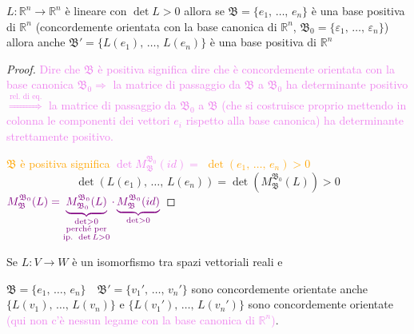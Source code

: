         \begin{proposizione}
        \label{prop:isometrie_dirette_preservano_orientazione}
        $L \colon \mathbb{R}^n \to \mathbb{R}^n$ è lineare con $\det L >0$ allora se $\mathfrak{B}= \{e_1, \, \dots, \, e_n\}$ è una 
        base positiva di $\mathbb{R}^n$ \textcolor{blu}{(concordemente orientata con la base canonica di $\mathbb{R}^n$, $\mathfrak{B}_0= \{\varepsilon_1, \, \dots, \, \varepsilon_n\}$)}
        allora anche $\mathfrak{B}'= \{L(e_1), \, \dots, \, L(e_n)\}$ è una base positiva di $\mathbb{R}^n$ 
        \end{proposizione}
        \begin{proof}
        \mbox{}

        \textcolor{violet}{Dire che $\mathfrak{B}$ è positiva significa dire che è concordemente orientata con la base canonica $\mathfrak{B}_0 \Rightarrow$ 
        la matrice di passaggio da $\mathfrak{B}$ a $\mathfrak{B}_0$ ha determinante positivo $\overset{\text{rel. di eq.}}{\Rightarrow}$ 
        la matrice di passaggio da $\mathfrak{B}_0$ a $\mathfrak{B}$ (che si costruisce proprio mettendo in colonna le componenti dei vettori $e_i$ rispetto alla base canonica) ha determinante strettamente positivo.}

        \textcolor{orange}{$\mathfrak{B}$ è positiva significa \textcolor{violet}{$\det M^{\mathfrak{B}_0}_{\mathfrak{B}}(id) =$} $\det \left( e_1, \, \dots, \, e_n \right) >0$ }
        \[ \det \left( L \left( e_1 \right), \, \dots, \, L \left( e_n \right) \right) = \det \left( M^{\mathfrak{B}_0}_{\mathfrak{B}}(L) \right) >0 \]
        $\textcolor{violet}{M_{\mathfrak{B}}^{\mathfrak{B}_0}(L) = \underbrace{M_{\mathfrak{B}_0}^{\mathfrak{B}_0}(L)}_{\substack{\det >0 \\ \text{perché per} \\ \text{ip. } \det L >0}} \cdot \underbrace{M_{\mathfrak{B}}^{\mathfrak{B}_0}(id)}_{\det >0}}$
        \end{proof}
        \begin{osservazione}
        Se $L \colon V \to W$ è un isomorfismo tra spazi vettoriali reali e
        
        $\mathfrak{B}= \{e_1, \, \dots, \, e_n\} \quad \mathfrak{B}'= \{v_1', \, \dots, \, v_n' \}$ sono concordemente orientate
        anche $\{L(v_1), \, \dots , \, L(v_n) \}$ e  $\{L(v_1'), \, \dots , \, L(v_n') \}$ sono concordemente orientate \textcolor{violet}{(qui 
        non c'è nessun legame con la base canonica di $\mathbb{R}^n$)}.
        \end{osservazione}
